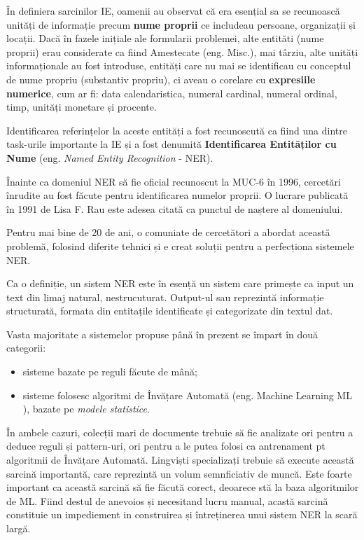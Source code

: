 În definiera sarcinilor IE, oamenii au observat că era esențial sa se recunoască unități de informație precum \textbf{nume proprii} ce includeau persoane, organizații și locații. Dacă în fazele inițiale ale formularii problemei, alte entităti (nume proprii) erau considerate ca fiind Amestecate (eng. Misc.), mai târziu, alte unități informaționale au fost introduse, entități care nu mai se identificau cu conceptul de nume propriu (substantiv propriu), ci aveau o corelare cu \textbf{expresiile numerice}, cum ar fi: data calendaristica, numeral cardinal, numeral ordinal, timp, unități monetare și procente.


Identificarea referințelor la aceste entități a fost recunoscută ca fiind una dintre task-urile importante la IE și a fost denumită \textbf{Identificarea Entităților cu Nume} (eng. \textit{Named Entity Recognition} - NER).


Înainte ca domeniul NER să fie oficial recunoscut la MUC-6 în 1996, cercetări înrudite au fost făcute pentru identificarea numelor proprii. O lucrare publicată în 1991 de Lisa F. Rau este adesea citată ca punctul de naștere al domeniului.\cite{rau1991}

Pentru mai bine de 20 de ani, o comuniate de cercetători a abordat această problemă, folosind diferite tehnici și e creat soluții pentru a perfecționa sistemele NER.


Ca o definiție, un sistem NER este în esență un sistem care primește ca input un text din limaj natural, nestrucuturat. Output-ul sau reprezintă informație structurată, formata din entitațile identificate și categorizate din textul dat.


Vasta majoritate a sistemelor propuse până în prezent se împart în două categorii:

\begin{itemize}
\item sisteme bazate pe reguli făcute de mână;
\item sisteme folosesc algoritmi de Învățare Automată (eng. Machine Learning ML ), bazate pe \textit{modele statistice}.
\end{itemize}


În ambele cazuri, colecții mari de documente trebuie să fie analizate ori pentru a deduce reguli și pattern-uri, ori pentru a le putea folosi ca antrenament pt algoritmii de Învățare Automată. Lingviști specializați trebuie să execute această sarcină importantă, care reprezintă un volum semnficiativ de muncă. Este foarte important ca această sarcină să fie făcută corect, deoarece stă la baza algoritmilor de ML. Fiind destul de anevoios și necesitand lucru manual, acastă sarcină constituie un impediement in construirea și întreținerea unui sistem NER la scară largă.

